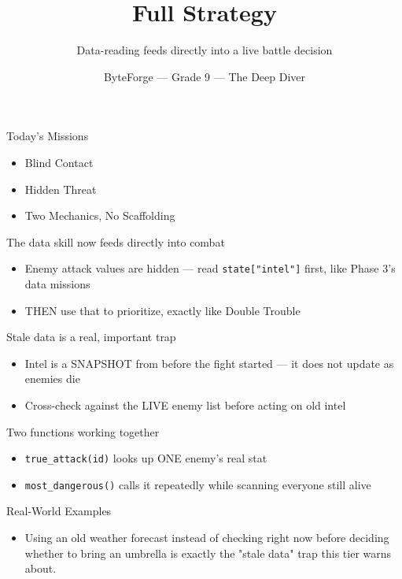 \documentclass[aspectratio=169]{beamer}
\title{Full Strategy}
\subtitle{Data-reading feeds directly into a live battle decision}
\author{ByteForge --- Grade 9 --- The Deep Diver}
\date{}
\begin{document}
\begin{frame}
    \titlepage
\end{frame}

\begin{frame}{Today's Missions}
    \Large
    \begin{itemize}
        \item Blind Contact
        \item Hidden Threat
        \item Two Mechanics, No Scaffolding
    \end{itemize}
\end{frame}

\begin{frame}{The data skill now feeds directly into combat}
    \large
    \begin{itemize}
        \item Enemy attack values are hidden --- read \texttt{state["intel"]} first, like Phase 3's data missions
        \item THEN use that to prioritize, exactly like Double Trouble
    \end{itemize}
\end{frame}


\begin{frame}{Stale data is a real, important trap}
    \large
    \begin{itemize}
        \item Intel is a SNAPSHOT from before the fight started --- it does not update as enemies die
        \item Cross-check against the LIVE enemy list before acting on old intel
    \end{itemize}
\end{frame}


\begin{frame}{Two functions working together}
    \large
    \begin{itemize}
        \item \texttt{true\_attack(id)} looks up ONE enemy's real stat
        \item \texttt{most\_dangerous()} calls it repeatedly while scanning everyone still alive
    \end{itemize}
\end{frame}

\begin{frame}{Real-World Examples}
    \large
    \begin{itemize}
        \item Using an old weather forecast instead of checking right now before deciding whether to bring an umbrella is exactly the "stale data" trap this tier warns about.
    \end{itemize}
\end{frame}
\end{document}
